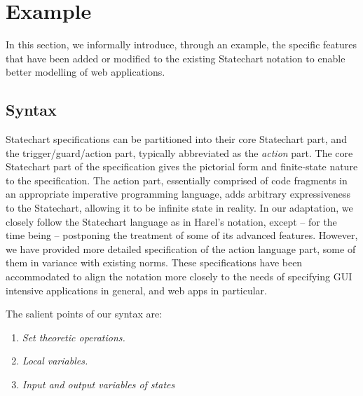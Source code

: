 \documentclass[12pt,a4paper]{report}
\begin{document}
\section{Example}
In this section, we informally introduce, through an example, the specific features that have been added or modified to the existing Statechart notation to enable better modelling of web applications.


\subsection{Syntax}
\begin{scriptsize}

\end{scriptsize}

Statechart specifications can be partitioned into their core Statechart part, and the trigger/guard/action part, typically abbreviated as the \emph{action} part. The core Statechart part of the specification gives the pictorial form and finite-state nature to the specification. The action part, essentially comprised of code fragments in an appropriate imperative programming language, adds arbitrary expressiveness to the Statechart, allowing it to be infinite state in reality. In our adaptation, we closely follow the Statechart language as in Harel's notation, except -- for the time being -- postponing the treatment of some of its advanced features. However, we have provided more detailed specification of the action language part, some of them in variance with existing norms. These specifications have been accommodated to align the notation more closely to the needs of specifying GUI intensive applications in general, and web apps in particular.


The salient points of our syntax are:
\begin{enumerate}
	\item \emph{Set theoretic operations.}
	\item \emph{Local variables.}
	\item \emph{Input and output variables of states}
\end{enumerate}
\end{document}
